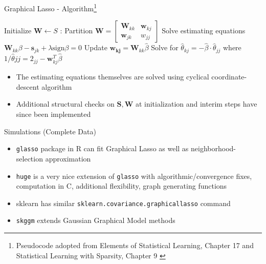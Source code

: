 \documentclass{beamer}
\begin{document}
\begin{frame}{Graphical Lasso - Algorithm\footnote{Pseudocode adopted from Elements of Statistical Learning, Chapter 17 \cite{hastie_elements_2009} and Statistical Learning with Sparsity, Chapter 9 \cite{hastie_statistical_2016}}}

\begin{algorithmic}[1]
    \State Initialize $\mathbf{W} \gets S$
    :
    \State Partition $\mathbf{W} = \begin{bmatrix} \mathbf{W}_{kk} & \mathbf{w}_{kj} \\ \mathbf{w}_{jk} & w_{jj} \end{bmatrix}$
    \State Solve estimating equations $\mathbf{W}_{kk}\beta - \mathbf{s}_{jk} + \lambda \text{sign}\beta = 0$
    \State Update $\mathbf{w_{kj}} = \mathbf{W}_{kk}\hat\beta$
    \EndFor
    \State Solve for $\hat\theta_{kj} = -\hat\beta \cdot \hat\theta_{jj}$ where $1/\hat\theta{jj}=2_{jj}-\mathbf{w}_{kj}^T\hat\beta$
    \EndFor
\end{algorithmic}

\begin{itemize}
    \item The estimating equations themselves are solved using cyclical coordinate-descent algorithm 
    \item Additional structural checks on $\mathbf{S,W}$ at initialization and interim steps have since been implemented
\end{itemize}
\end{frame}

\begin{frame}{Simulations (Complete Data)}
    \begin{itemize}
        \item \texttt{glasso} package in R can fit Graphical Lasso as well as neighborhood-selection approximation 
        \item \texttt{huge} is a very nice extension of \texttt{glasso} with algorithmic/convergence fixes, computation in C, additional flexibility, graph generating functions 
        \item sklearn has similar \texttt{sklearn.covariance.graphicallasso} command 
        \item \texttt{skggm} extends Gaussian Graphical Model methods  %
    \end{itemize}
\end{frame}
\end{document}
